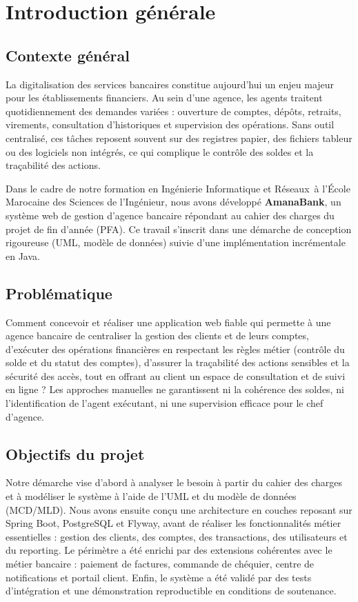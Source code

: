 \documentclass[11pt,a4paper,oneside]{report}
\newcommand{\ecole}{École Marocaine des Sciences de l'Ingénieur}
\newcommand{\filiere}{Ingénierie Informatique et Réseaux}
\newcommand{\nomapplication}{AmanaBank}
\begin{document}
\chapter*{Introduction générale}
\label{ch:intro}

\section{Contexte général}

La digitalisation des services bancaires constitue aujourd'hui un enjeu majeur pour les établissements financiers. Au sein d'une agence, les agents traitent quotidiennement des demandes variées : ouverture de comptes, dépôts, retraits, virements, consultation d'historiques et supervision des opérations. Sans outil centralisé, ces tâches reposent souvent sur des registres papier, des fichiers tableur ou des logiciels non intégrés, ce qui complique le contrôle des soldes et la traçabilité des actions.

Dans le cadre de notre formation en \filiere\ à l'\ecole, nous avons développé \textbf{\nomapplication}, un système web de gestion d'agence bancaire répondant au cahier des charges du projet de fin d'année (PFA). Ce travail s'inscrit dans une démarche de conception rigoureuse (UML, modèle de données) suivie d'une implémentation incrémentale en Java.

\section{Problématique}

Comment concevoir et réaliser une application web fiable qui permette à une agence bancaire de centraliser la gestion des clients et de leurs comptes, d'exécuter des opérations financières en respectant les règles métier (contrôle du solde et du statut des comptes), d'assurer la traçabilité des actions sensibles et la sécurité des accès, tout en offrant au client un espace de consultation et de suivi en ligne ? Les approches manuelles ne garantissent ni la cohérence des soldes, ni l'identification de l'agent exécutant, ni une supervision efficace pour le chef d'agence.

\section{Objectifs du projet}

Notre démarche vise d'abord à analyser le besoin à partir du cahier des charges et à modéliser le système à l'aide de l'UML et du modèle de données (MCD/MLD). Nous avons ensuite conçu une architecture en couches reposant sur Spring Boot, PostgreSQL et Flyway, avant de réaliser les fonctionnalités métier essentielles : gestion des clients, des comptes, des transactions, des utilisateurs et du reporting. Le périmètre a été enrichi par des extensions cohérentes avec le métier bancaire : paiement de factures, commande de chéquier, centre de notifications et portail client. Enfin, le système a été validé par des tests d'intégration et une démonstration reproductible en conditions de soutenance.
\end{document}
